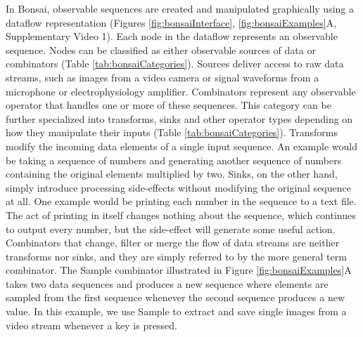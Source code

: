 In Bonsai, observable sequences are created and manipulated graphically using a dataflow \cite{Mosconi2000, Johnston2004} representation (Figures \ref{fig:bonsaiInterface}, \ref{fig:bonsaiExamples}A, Supplementary Video 1). Each node in the dataflow represents an observable sequence. Nodes can be classified as either observable sources of data or combinators (Table \ref{tab:bonsaiCategories}). Sources deliver access to raw data streams, such as images from a video camera or signal waveforms from a microphone or electrophysiology amplifier. Combinators represent any observable operator that handles one or more of these sequences. This category can be further specialized into transforms, sinks and other operator types depending on how they manipulate their inputs (Table \ref{tab:bonsaiCategories}). Transforms modify the incoming data elements of a single input sequence. An example would be taking a sequence of numbers and generating another sequence of numbers containing the original elements multiplied by two. Sinks, on the other hand, simply introduce processing side-effects without modifying the original sequence at all. One example would be printing each number in the sequence to a text file. The act of printing in itself changes nothing about the sequence, which continues to output every number, but the side-effect will generate some useful action. Combinators that change, filter or merge the flow of data streams are neither transforms nor sinks, and they are simply referred to by the more general term combinator. The Sample combinator illustrated in Figure \ref{fig:bonsaiExamples}A takes two data sequences and produces a new sequence where elements are sampled from the first sequence whenever the second sequence produces a new value. In this example, we use Sample to extract and save single images from a video stream whenever a key is pressed.

